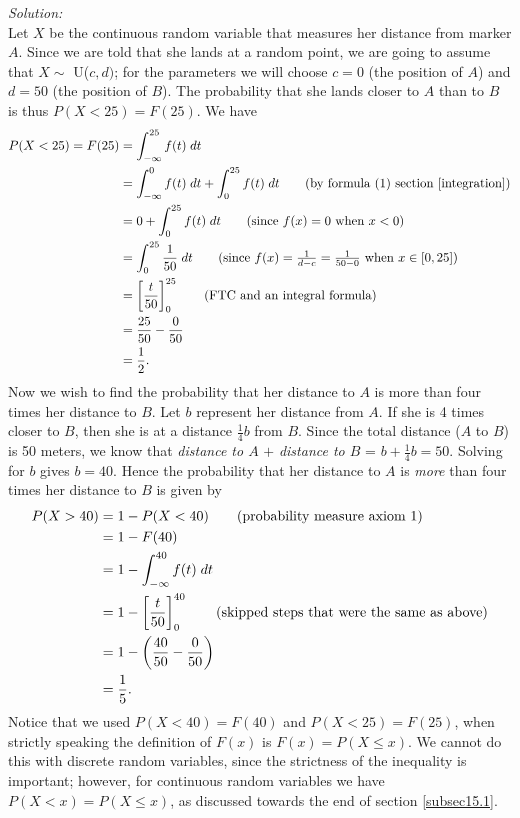\noindent \textit{Solution:} \\
Let $X$ be the continuous random variable that measures her distance from marker $A$. Since we are told that she lands at a random point, we are going to assume that $X \sim$ U($c,d)$; for the parameters we will choose $c = 0$ (the position of $A$) and $d = 50$ (the position of $B$). The probability that she lands closer to $A$ than to $B$ is thus $P(X < 25) = F(25)$. We have
\begin{align*}
P(X < 25) = F(25) & = \int_{-\infty}^{25} f(t) \; dt \\
	& = \int_{-\infty}^0 f(t) \; dt + \int_0^{25} f(t) \; dt \tag{by formula (1) section \ref{integration}} \\
	& = 0 +  \int_0^{25} f(t) \; dt \tag{since $f(x) = 0$ when $x < 0$} \\
	& = \int_0^{25} \frac{1}{50} \; dt \tag{since $f(x) = \frac{1}{d-c} = \frac{1}{50-0}$ when $x \in [0,25]$} \\
	& = \squac{\frac{t}{50}}^{25}_0 \tag{FTC and an integral formula} \\
	& = \frac{25}{50} - \frac{0}{50} \\
	& = \frac{1}{2}.
\end{align*}
Now we wish to find the probability that her distance to $A$ is more than four times her distance to $B$. Let $b$ represent her distance from $A$. If she is 4 times closer to $B$, then she is at a distance $\frac{1}{4}b$ from $B$. Since the total distance ($A$ to $B$) is 50 meters, we know that \textit{distance to $A$} $+$ \textit{distance to $B$} = $b + \frac{1}{4}b = 50$. Solving for $b$ gives $b = 40$. Hence the probability that her distance to $A$ is \textit{more} than four times her distance to $B$ is given by
\begin{align*}
P(X > 40) & = 1 - P(X < 40) \tag{probability measure axiom 1} \\
	& = 1 - F(40) \\
	& =  1 - \int_{-\infty}^{40} f(t) \; dt \\
	& = 1 - \left[\frac{t}{50}\right]^{40}_0 \tag{skipped steps that were the same as above} \\
	& = 1 - \left(\frac{40}{50} - \frac{0}{50}\right) \\
	& = \frac{1}{5}.
\end{align*}
Notice that we used $P(X < 40) = F(40)$ and $P(X < 25) = F(25)$, when strictly speaking the definition of $F(x)$ is $F(x) = P(X \leq x)$. We cannot do this with discrete random variables, since the strictness of the inequality is important; however, for continuous random variables we have $P(X < x) = P(X \leq x)$, as discussed towards the end of section \ref{subsec15.1}.

